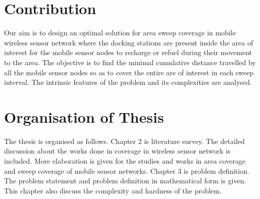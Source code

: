 \section{Contribution}
Our aim is to design an optimal solution for area sweep coverage in mobile wireless sensor network where the docking stations are present inside the area of interest for the mobile sensor nodes to recharge or refuel during their movement to the area. The objective is to find the minimal cumulative distance travelled by all the mobile sensor nodes so as to cover the entire are of interest in each sweep interval. The intrinsic features of the problem and its complexities are analysed.

\section{Organisation of Thesis}
The thesis is organised as follows. Chapter 2 is literature survey. The detailed discussion about the works done in coverage in wireless sensor network is included. More elaboration is given for the studies and works in area coverage and sweep coverage of mobile sensor networks. Chapter 3 is problem definition. The problem statement and problem definition in mathematical form is given. This chapter also discuss the complexity and hardness of the problem.


\newpage
\thispagestyle{empty}
